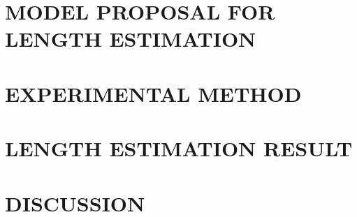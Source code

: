 \documentclass[conference,a4paper,final]{IEEEtran}
\begin{document}
\section{MODEL PROPOSAL FOR LENGTH ESTIMATION}


\section{EXPERIMENTAL METHOD}


\section{LENGTH ESTIMATION RESULT}


\section{DISCUSSION}


% 

% 


\clearpage

\footnotesize


\end{document}
